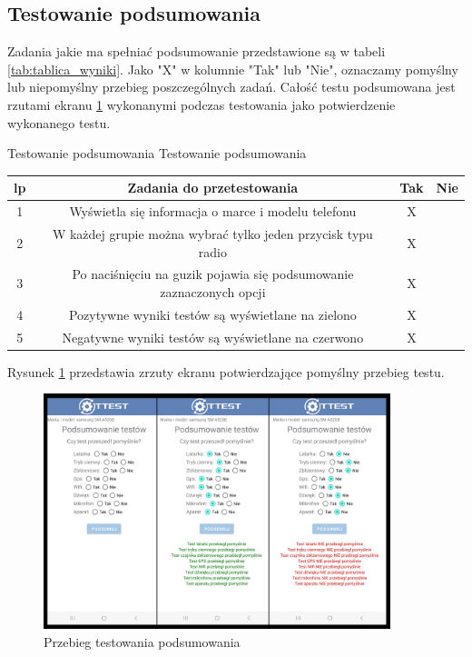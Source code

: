 \newpage


\subsection{Testowanie podsumowania}

\hspace{0.60cm}Zadania jakie ma spełniać podsumowanie przedstawione są w tabeli \ref{tab:tablica_wyniki}. Jako "X" w kolumnie "Tak" lub "Nie", oznaczamy pomyślny lub niepomyślny przebieg poszczególnych zadań. Całość testu podsumowana jest rzutami ekranu \ref{rys:wyniki_5} wykonanymi podczas testowania jako potwierdzenie wykonanego testu.

\begin{tabela}
	{Testowanie podsumowania}	%
	{Testowanie podsumowania}	%
	{
		\begin{tabular}{|c|c|c|c|} \hline
			\textbf{lp} & \textbf{Zadania do przetestowania} & \textbf{Tak} & \textbf{Nie} \\ \hline
			1 & Wyświetla się informacja o marce i modelu telefonu & X & ~ \\ \hline
			2 & W każdej grupie można wybrać tylko jeden przycisk typu radio & X & ~ \\ \hline
			3 & Po naciśnięciu na guzik pojawia się podsumowanie zaznaczonych opcji & X & ~ \\ \hline
			4 & Pozytywne wyniki testów są wyświetlane na zielono & X & ~ \\ \hline
			5 & Negatywne wyniki testów są wyświetlane na czerwono & X & ~ \\ \hline
	\end{tabular}	}
	\label{tab:tablica_wyniki}
\end{tabela}

Rysunek \ref{rys:wyniki_5} przedstawia zrzuty ekranu potwierdzające pomyślny przebieg testu.

\begin{figure}[!hbt]
	\begin{center}
		\includegraphics[angle=360, width=0.90\textwidth]{rys/punkt5/wyniki.png}
		\caption{Przebieg testowania podsumowania}
		\label{rys:wyniki_5}
	\end{center}
\end{figure}   

\newpage

